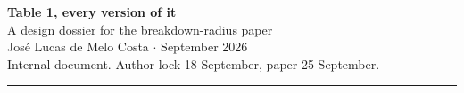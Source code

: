 \documentclass[10pt,a4paper]{article}
\begin{document}
\begin{center}
{\LARGE\bfseries Table 1, every version of it}\\[4pt]
{\large A design dossier for the breakdown-radius paper}\\[8pt]
{\normalsize José Lucas de Melo Costa \quad$\cdot$ September 2026}\\[4pt]
{\footnotesize Internal document. Author lock 18 September, paper 25 September.}
\end{center}
\vspace{4pt}
\hrule
\vspace{10pt}








\end{document}

